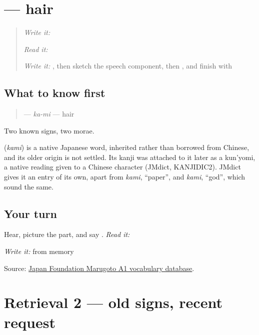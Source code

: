 \section[\texorpdfstring{\ja{かみ} (kami)}{かみ (kami)}]{ — hair}

\label{lesson:JA-C12-kami}



\begin{quote}
\emph{Write it:} \textbf{}

\emph{Read it:} \textbf{}

\emph{Write it:} \textbf{}, then sketch the speech component, then \textbf{}, and finish with \textbf{}
\end{quote}

\subsection*{What to know first}
\begin{quote}
\textbf{} — \emph{ka-mi} — hair
\end{quote}

Two known signs, two morae.

\begin{cousinweb}
\textbf{} (\emph{kami}) is a native Japanese word, inherited rather than borrowed from Chinese, and its older origin is not settled. Its kanji was attached to it later as a kun'yomi, a native reading given to a Chinese character (JMdict, KANJIDIC2). JMdict gives it an entry of its own, apart from \emph{kami}, \textquotedblleft{}paper\textquotedblright{}, and \emph{kami}, \textquotedblleft{}god\textquotedblright{}, which sound the same.
\end{cousinweb}

\subsection*{Your turn}
Hear, picture the part, and say \textbf{}. \emph{Read it:} \textbf{}

\emph{Write it:} \textbf{} from memory

\begin{tcolorbox}[breakable,colback=teal!4,colframe=teal!35!black,title={Before you move on}]
Source: \href{https://words.marugotoweb.jp/}{Japan Foundation Marugoto A1 vocabulary database}.
\end{tcolorbox}
\section[Practice]{Retrieval 2 — old signs, recent request}

